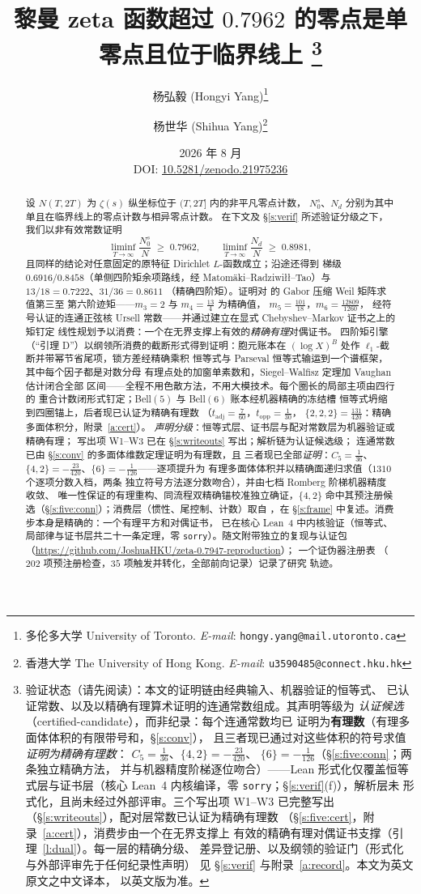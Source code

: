 \documentclass[11pt]{article}
\title{\bf 黎曼 zeta 函数超过 $0.7962$ 的零点是单零点且位于临界线上%
\thanks{验证状态（请先阅读）：本文的证明链由经典输入、机器验证的恒等式、
已认证常数、以及以精确有理算术证明的连通常数组成。其声明等级为
\emph{认证候选}（certified-candidate），而非纪录：每个连通常数均已
证明为\textbf{有理数}（有理多面体体积的有限带号和，\S\ref{s:conv}），
且三者现已通过对这些体积的符号求值\emph{证明为精确有理数}：
$C_5=\tfrac1{36}$、$\{4,2\}=-\tfrac{23}{420}$、
$\{6\}=-\tfrac1{126}$（\S\ref{s:five:conn}；两条独立精确方法，
并与机器精度阶梯逐位吻合）——Lean 形式化仅覆盖恒等式层与证书层（核心
Lean~4 内核编译，零 \texttt{sorry}；\S\ref{s:verif}(f)），解析层未
形式化，且尚未经过外部评审。三个写出项 W1--W3 已完整写出
（\S\ref{s:writeouts}），配对层常数已认证为精确有理数
（\S\ref{s:five:cert}，附录~\ref{a:cert}），消费步由一个在无界支撑上
有效的精确有理对偶证书支撑（引理~\ref{l:dual}）。每一层的精确分级、
差异登记册、以及纲领的验证门（形式化与外部评审先于任何纪录性声明）
见 \S\ref{s:verif} 与附录~\ref{a:record}。本文为英文原文之中文译本，
以英文版为准。}}
\author{杨弘毅 (Hongyi Yang)\thanks{多伦多大学 University of
Toronto. \textit{E-mail}: \texttt{hongy.yang@mail.utoronto.ca}}
\and 杨世华 (Shihua Yang)\thanks{香港大学 The University of Hong
Kong. \textit{E-mail}: \texttt{u3590485@connect.hku.hk}}}
\date{2026 年 8 月\\[4pt]
\small DOI: \href{https://doi.org/10.5281/zenodo.21975236}%
{10.5281/zenodo.21975236}}
\numberwithin{equation}{section}
\theoremstyle{definition}
\theoremstyle{remark}
\begin{document}
\maketitle

\begin{abstract}
设 $N(T,2T)$ 为 $\zeta(s)$ 纵坐标位于 $(T,2T]$ 内的非平凡零点计数，
$N_0^{s}$、$N_d$ 分别为其中单且在临界线上的零点计数与相异零点计数。
在下文及 \S\ref{s:verif} 所述验证分级之下，我们以非有效常数证明
\[
\liminf_{T\to\infty}\frac{N_0^{s}}{N}\;\ge\;0.7962,
\qquad
\liminf_{T\to\infty}\frac{N_d}{N}\;\ge\;0.8981,
\]
且同样的结论对任意固定的原特征 Dirichlet $L$-函数成立；沿途还得到
梯级 $0.6916/0.8458$（单侧四阶矩余项路线，经
Matom\"aki--Radziwi\l{}\l--Tao）与 $13/18=0.7222$、$31/36=0.8611$
（精确四阶矩）。证明对 \cite{C26} 的 Gabor 压缩 Weil 矩阵求值第三至
第六阶迹矩——$m_3=2$ 与 $m_4=\tfrac{13}4$ 为精确值，
$m_5=\tfrac{101}{18}$，$m_6=\tfrac{12809}{1260}$，
经符号认证的连通正弦核 Ursell 常数——并通过建立在显式 Chebyshev--Markov 证书之上的矩钉定
线性规划予以消费：一个在无界支撑上有效的\emph{精确有理}对偶证书。
四阶矩引擎（``引理 D''）以纲领所消费的截断形式得到证明：胞元账本在
$(\log X)^{B}$ 处作 $\ell_1$-截断并带幂节省尾项，锁方差经精确乘积
恒等式与 Parseval 恒等式输运到一个谱框架，其中每个因子都是对数分母
有理点处的加窗单素数和，Siegel--Walfisz 定理加 Vaughan 估计闭合全部
区间——全程不用色散方法，不用大模技术。每个圈长的局部主项由四行的
重合计数闭形式钉定；Bell$(5)$ 与 Bell$(6)$ 账本经机器精确的冻结槽
恒等式坍缩到四圈锚上，后者现已认证为精确有理数
（$t_{\mathrm{adj}}=\tfrac7{60}$，$t_{\mathrm{opp}}=\tfrac1{30}$，
$\{2,2,2\}=\tfrac{131}{420}$：精确多面体积分，附录~\ref{a:cert}）。
\emph{声明分级}：恒等式层、证书层与配对常数层为机器验证或精确有理；
写出项 W1--W3 已在 \S\ref{s:writeouts} 写出；解析链为认证候选级；
连通常数已由 \S\ref{s:conv} 的多面体维数定理证明为有理数，且
三者现已全部\emph{证明}：$C_5=\tfrac1{36}$、
$\{4,2\}=-\tfrac{23}{420}$、$\{6\}=-\tfrac1{126}$——逐项提升为
有理多面体体积并以精确面递归求值（$1310$ 个逐项分数入档，两条
独立符号方法逐分数吻合），并由七档 Romberg 阶梯机器精度收敛、
唯一性保证的有理重构、同流程双精确锚校准独立确证，$\{4,2\}$
命中其预注册候选（\S\ref{s:five:conn}）；消费层（惯性、尾控制、计数）取自 \cite{C26}，在
\S\ref{s:frame} 中复述。消费步本身是精确的：一个有理平方和对偶证书，
已在核心 Lean~4 中内核验证（恒等式、局部律与证书层共二十一条定理，零
\texttt{sorry}）。随文附带独立的复现与认证包
（\url{https://github.com/JoshuaHKU/zeta-0.7947-reproduction}）；
一个证伪器注册表
（$202$ 项预注册检查，$35$ 项触发并转化，全部前向记录）记录了研究
轨迹。
\end{abstract}
\newpage
\tableofcontents
\newpage
\end{document}
